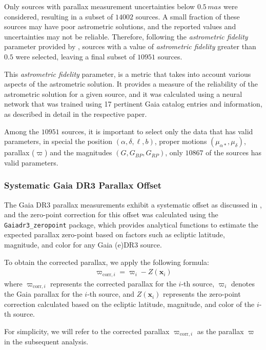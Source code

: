 \documentclass[baaa]{baaa}
\begin{document}
Only sources with parallax measurement uncertainties below $0.5\, mas$ were considered, resulting in a subset of $14002$ sources. A small fraction of these sources may have poor astrometric solutions, and the reported values and uncertainties may not be reliable. Therefore, following the \textit{astrometric fidelity} parameter provided by \citet{2022MNRAS.510.2597R}, sources with a value of \textit{astrometric fidelity} greater than $0.5$ were selected, leaving a final subset of $10951$ sources.

This \textit{astrometric fidelity} parameter, is a metric that takes into account various aspects of the astrometric solution. It provides a measure of the reliability of the astrometric solution for a given source, and it was calculated using a neural network that was trained using 17 pertinent Gaia catalog entries and information, as described in detail in the respective paper.

Among the $10951$ sources, it is important to select only the data that has valid parameters, in special the position $(\alpha,\delta,\ell,b)$, proper motions $(\mu_{\alpha*},\mu_\delta)$, parallax ($\varpi$) and the magnitudes $(G, G_{BP}, G_{RP})$, only $10867$ of the sources has valid parameters.

\subsubsection{Systematic Gaia DR3 Parallax Offset}
The Gaia DR3 parallax measurements exhibit a systematic offset as discussed in \citet{2021A&A...649A...4L}, and the zero-point correction for this offset was calculated using the \texttt{Gaiadr3\_zeropoint} package, which provides analytical functions to estimate the expected parallax zero-point based on factors such as ecliptic latitude, magnitude, and color for any Gaia (e)DR3 source.

To obtain the corrected parallax, we apply the following formula:
\begin{align*}
\varpi_{\text{corr},i} = \varpi_i - Z(\boldsymbol{x}_i)
\end{align*}
where $\varpi_{\text{corr},i}$ represents the corrected parallax for the $i$-th source, $\varpi_i$ denotes the Gaia parallax for the $i$-th source, and $Z(\boldsymbol{x}_i)$ represents the zero-point correction calculated based on the ecliptic latitude, magnitude, and color of the $i$-th source.

For simplicity, we will refer to the corrected parallax $\varpi_{\text{corr},i}$ as the parallax $\varpi$ in the subsequent analysis.
\end{document}
